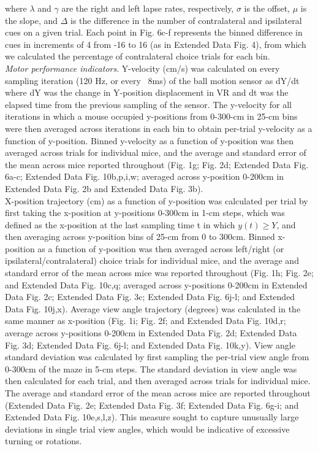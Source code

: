 where $\lambda$ and $\gamma$ are the right and left lapse rates, respectively, $\sigma$ is the offset, $\mu$ is the slope, and $\Delta$ is the difference in the number of contralateral and ipsilateral cues on a given trial.  Each point in Fig. 6c-f represents the binned difference in cues in increments of 4 from -16 to 16 (as in Extended Data Fig. 4), from which we calculated the percentage of contralateral choice trials for each bin. \\
\textit{Motor performance indicators}. Y-velocity (cm/s) was calculated on every sampling iteration (120 Hz, or every ~8ms) of the ball motion sensor as dY/dt where dY was the change in Y-position displacement in VR and dt was the elapsed time from the previous sampling of the sensor. The y-velocity for all iterations in which a mouse occupied y-positions from 0-300-cm in 25-cm bins were then averaged across iterations in each bin to obtain per-trial y-velocity as a function of y-position. Binned y-velocity as a function of y-position was then averaged across trials for individual mice, and the average and standard error of the mean across mice reported throughout (Fig. 1g; Fig. 2d; Extended Data Fig. 6a-c; Extended Data Fig. 10b,p,i,w; averaged across y-position 0-200cm in Extended Data Fig. 2b and Extended Data Fig. 3b). \\
X-position trajectory (cm) as a function of y-position was calculated per trial by first taking the x-position at y-positions 0-300cm in 1-cm steps, which was defined as the x-position at the last sampling time t in which $y(t) \geq Y$, and then averaging across y-position bins of 25-cm from 0 to 300cm. Binned x-position as a function of y-position was then averaged across left/right (or ipsilateral/contralateral) choice trials for individual mice, and the average and standard error of the mean across mice was reported throughout (Fig. 1h; Fig. 2e; and Extended Data Fig. 10c,q; averaged across y-positions 0-200cm in Extended Data Fig. 2c; Extended Data Fig. 3c; Extended Data Fig. 6j-l; and Extended Data Fig. 10j,x). Average view angle trajectory (degrees) was calculated in the same manner as x-position (Fig. 1i; Fig. 2f; and Extended Data Fig. 10d,r; average across y-positions 0-200cm in Extended Data Fig. 2d; Extended Data Fig. 3d; Extended Data Fig. 6j-l; and Extended Data Fig. 10k,y). View angle standard deviation was calculated by first sampling the per-trial view angle from 0-300cm of the maze in 5-cm steps. The standard deviation in view angle was then calculated for each trial, and then averaged across trials for individual mice. The average and standard error of the mean across mice are reported throughout (Extended Data Fig. 2e; Extended Data Fig. 3f; Extended Data Fig. 6g-i; and Extended Data Fig. 10e,s,l,z). This measure sought to capture unusually large deviations in single trial view angles, which would be indicative of excessive turning or rotations. \\
